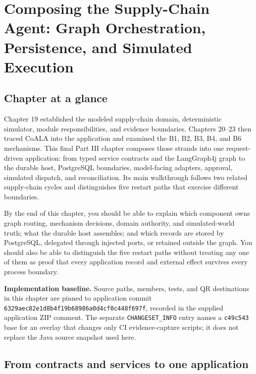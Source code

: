 \chapter{Composing the Supply-Chain Agent: Graph Orchestration, Persistence, and Simulated Execution}
\label{ch:composing-supply-chain-agent}

\section*{Chapter at a glance}
{}

Chapter 19 established the modeled supply-chain domain, deterministic simulator, module responsibilities, and evidence boundaries. Chapters 20--23 then traced CoALA into the application and examined the B1, B2, B3, B4, and B6 mechanisms. This final Part III chapter composes those strands into one request-driven application: from typed service contracts and the LangGraph4j graph to the durable host, PostgreSQL boundaries, model-facing adapters, approval, simulated dispatch, and reconciliation. Its main walkthrough follows two related supply-chain cycles and distinguishes five restart paths that exercise different boundaries.

\begin{learningbox}
By the end of this chapter, you should be able to explain which component owns graph routing, mechanism decisions, domain authority, and simulated-world truth; what the durable host assembles; and which records are stored by PostgreSQL, delegated through injected ports, or retained outside the graph. You should also be able to distinguish the five restart paths without treating any one of them as proof that every application record and external effect survives every process boundary.
\end{learningbox}

\begin{notebox}
\textbf{Implementation baseline.} Source paths, members, tests, and QR destinations in this chapter are pinned to application commit \texttt{6329aec82e1d8b4f19b68986a0d4cf0c448f697f}, recorded in the supplied application ZIP comment. The separate \texttt{CHANGESET\_INFO} entry names a \texttt{c49c543} base for an overlay that changes only CI evidence-capture scripts; it does not replace the Java source snapshot used here.
\end{notebox}

\section{From contracts and services to one application}
\label{sec:ch24-contracts-services-application}

